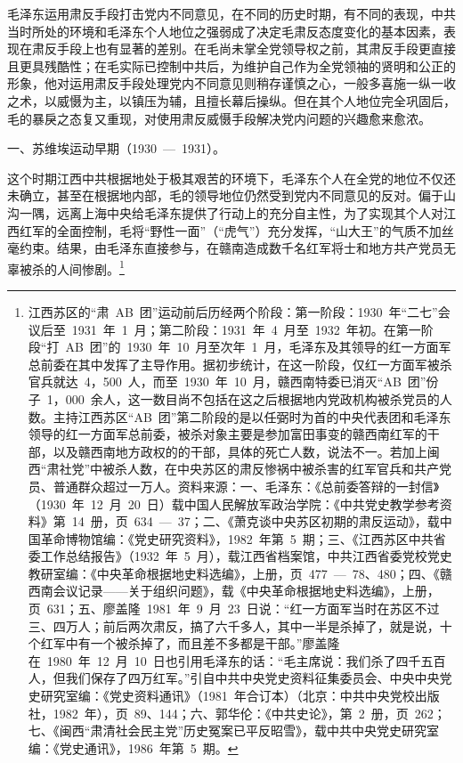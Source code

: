 毛泽东运用肃反手段打击党内不同意见，在不同的历史时期，有不同的表现，中共当时所处的环境和毛泽东个人地位之强弱成了决定毛肃反态度变化的基本因素，表现在肃反手段上也有显著的差别。在毛尚未掌全党领导权之前，其肃反手段更直接且更具残酷性；在毛实际已控制中共后，为维护自己作为全党领袖的贤明和公正的形象，他对运用肃反手段处理党内不同意见则稍存谨慎之心，一般多喜施一纵一收之术，以威慑为主，以镇压为辅，且擅长幕后操纵。但在其个人地位完全巩固后，毛的暴戾之态复又重现，对使用肃反威慑手段解决党内问题的兴趣愈来愈浓。

一、苏维埃运动早期（1930~—~1931）。

这个时期江西中共根据地处于极其艰苦的环境下，毛泽东个人在全党的地位不仅还未确立，甚至在根据地内部，毛的领导地位仍然受到党内不同意见的反对。偏于山沟一隅，远离上海中央给毛泽东提供了行动上的充分自主性，为了实现其个人对江西红军的全面控制，毛将“野性一面”（“虎气”）充分发挥，“山大王”的气质不加丝毫约束。结果，由毛泽东直接参与，在赣南造成数千名红军将士和地方共产党员无辜被杀的人间惨剧。\footnote{江西苏区的“肃~AB~团”运动前后历经两个阶段：第一阶段：1930~年“二七”会议后至~1931~年~1~月；第二阶段：1931~年~4~月至~1932~年初。在第一阶段“打~AB~团”的~1930~年~10~月至次年~1~月，毛泽东及其领导的红一方面军总前委在其中发挥了主导作用。据初步统计，在这一阶段，仅红一方面军被杀官兵就达~4，500~人，而至~1930~年~10~月，赣西南特委已消灭“AB~团”份子~1，000~余人，这一数目尚不包括在这之后根据地内党政机构被杀党员的人数。主持江西苏区“AB~团”第二阶段的是以任弼时为首的中央代表团和毛泽东领导的红一方面军总前委，被杀对象主要是参加富田事变的赣西南红军的干部，以及赣西南地方政权的的干部，具体的死亡人数，说法不一。若加上闽西“肃社党”中被杀人数，在中央苏区的肃反惨祸中被杀害的红军官兵和共产党员、普通群众超过一万人。资料来源：一、毛泽东：《总前委答辩的一封信》（1930~年~12~月~20~日）载中国人民解放军政治学院：《中共党史教学参考资料》第~14~册，页~634~—~37；二、《萧克谈中央苏区初期的肃反运动》，载中国革命博物馆编：《党史研究资料》，1982~年第~5~期；三、《江西苏区中共省委工作总结报告》（1932~年~5~月），载江西省档案馆，中共江西省委党校党史教研室编：《中央革命根据地史料选编》，上册，页~477~—~78、480；四、《赣西南会议记录——关于组织问题》，载《中央革命根据地史料选编》，上册，页~631；五、廖盖隆~1981~年~9~月~23~日说：“红一方面军当时在苏区不过三、四万人；前后两次肃反，搞了六千多人，其中一半是杀掉了，就是说，十个红军中有一个被杀掉了，而且差不多都是干部。”廖盖隆在~1980~年~12~月~10~日也引用毛泽东的话：“毛主席说：我们杀了四千五百人，但我们保存了四万红军。”引自中共中央党史资料征集委员会、中央中央党史研究室编：《党史资料通讯》（1981~年合订本）（北京：中共中央党校出版社，1982~年），页~89、144；六、郭华伦：《中共史论》，第~2~册，页~262；七、《闽西“肃清社会民主党”历史冤案已平反昭雪》，载中共中央党史研究室编：《党史通讯》，1986~年第~5~期。}

